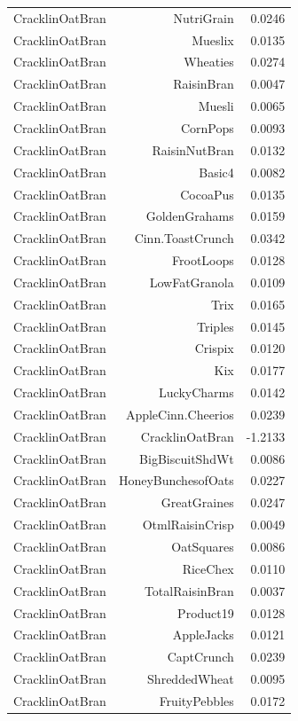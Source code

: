 \begin{longtable}{@{}lrr@{}}
CracklinOatBran & NutriGrain & 0.0246 \\
CracklinOatBran & Mueslix & 0.0135 \\
CracklinOatBran & Wheaties & 0.0274 \\
CracklinOatBran & RaisinBran & 0.0047 \\
CracklinOatBran & Muesli & 0.0065 \\
CracklinOatBran & CornPops & 0.0093 \\
CracklinOatBran & RaisinNutBran & 0.0132 \\
CracklinOatBran & Basic4 & 0.0082 \\
CracklinOatBran & CocoaPus & 0.0135 \\
CracklinOatBran & GoldenGrahams & 0.0159 \\
CracklinOatBran & Cinn.ToastCrunch & 0.0342 \\
CracklinOatBran & FrootLoops & 0.0128 \\
CracklinOatBran & LowFatGranola & 0.0109 \\
CracklinOatBran & Trix & 0.0165 \\
CracklinOatBran & Triples & 0.0145 \\
CracklinOatBran & Crispix & 0.0120 \\
CracklinOatBran & Kix & 0.0177 \\
CracklinOatBran & LuckyCharms & 0.0142 \\
CracklinOatBran & AppleCinn.Cheerios & 0.0239 \\
CracklinOatBran & CracklinOatBran & -1.2133 \\
CracklinOatBran & BigBiscuitShdWt & 0.0086 \\
CracklinOatBran & HoneyBunchesofOats & 0.0227 \\
CracklinOatBran & GreatGraines & 0.0247 \\
CracklinOatBran & OtmlRaisinCrisp & 0.0049 \\
CracklinOatBran & OatSquares & 0.0086 \\
CracklinOatBran & RiceChex & 0.0110 \\
CracklinOatBran & TotalRaisinBran & 0.0037 \\
CracklinOatBran & Product19 & 0.0128 \\
CracklinOatBran & AppleJacks & 0.0121 \\
CracklinOatBran & CaptCrunch & 0.0239 \\
CracklinOatBran & ShreddedWheat & 0.0095 \\
CracklinOatBran & FruityPebbles & 0.0172 \\

\end{longtable}
